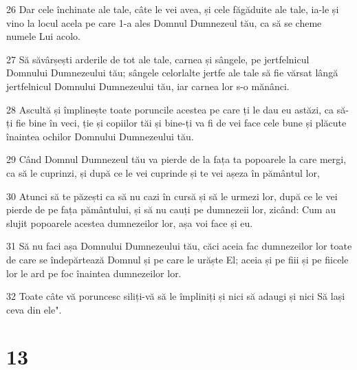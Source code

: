 \par 26 Dar cele închinate ale tale, câte le vei avea, și cele făgăduite ale tale, ia-le și vino la locul acela pe care 1-a ales Domnul Dumnezeul tău, ca să se cheme numele Lui acolo.
\par 27 Să săvârșești arderile de tot ale tale, carnea și sângele, pe jertfelnicul Domnului Dumnezeului tău; sângele celorlalte jertfe ale tale să fie vărsat lângă jertfelnicul Domnului Dumnezeului tău, iar carnea lor s-o mănânci.
\par 28 Ascultă și împlinește toate poruncile acestea pe care ți le dau eu astăzi, ca să-ți fie bine în veci, ție și copiilor tăi și bine-ți va fi de vei face cele bune și plăcute înaintea ochilor Domnului Dumnezeului tău.
\par 29 Când Domnul Dumnezeul tău va pierde de la fața ta popoarele la care mergi, ca să le cuprinzi, și după ce le vei cuprinde și te vei așeza în pământul lor,
\par 30 Atunci să te păzești ca să nu cazi în cursă și să le urmezi lor, după ce le vei pierde de pe fața pământului, și să nu cauți pe dumnezeii lor, zicând: Cum au slujit popoarele acestea dumnezeilor lor, așa voi face și eu.
\par 31 Să nu faci așa Domnului Dumnezeului tău, căci aceia fac dumnezeilor lor toate de care se îndepărtează Domnul și pe care le urăște El; aceia și pe fiii și pe fiicele lor le ard pe foc înaintea dumnezeilor lor.
\par 32 Toate câte vă poruncesc siliți-vă să le împliniți și nici să adaugi și nici Să lași ceva din ele".

\chapter{13}

